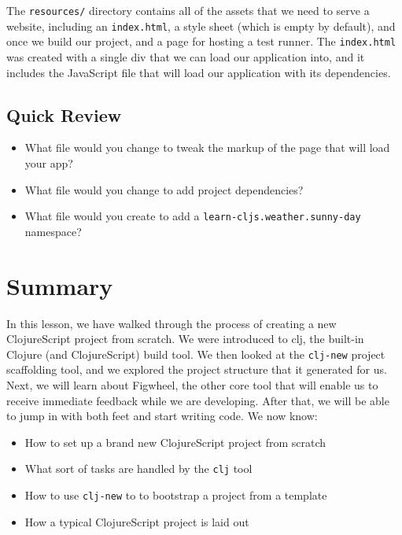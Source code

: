 \documentclass[10pt,twoside,openright]{memoir}
\begin{document}
The \texttt{resources/} directory contains all of the assets that we
need to serve a website, including an \texttt{index.html}, a style sheet
(which is empty by default), and once we build our project, and a page
for hosting a test runner. The \texttt{index.html} was created with a
single div that we can load our application into, and it includes the
JavaScript file that will load our application with its dependencies.

\subsection{Quick Review}

\begin{itemize}
\tightlist
\item
  What file would you change to tweak the markup of the page that will
  load your app?
\item
  What file would you change to add project dependencies?
\item
  What file would you create to add a
  \texttt{learn-cljs.weather.sunny-day} namespace?
\end{itemize}

\section{Summary}

In this lesson, we have walked through the process of creating a new
ClojureScript project from scratch. We were introduced to clj, the
built-in Clojure (and ClojureScript) build tool. We then looked at the
\texttt{clj-new} project scaffolding tool, and we explored the project
structure that it generated for us. Next, we will learn about Figwheel,
the other core tool that will enable us to receive immediate feedback
while we are developing. After that, we will be able to jump in with
both feet and start writing code. We now know:

\begin{itemize}
\tightlist
\item
  How to set up a brand new ClojureScript project from scratch
\item
  What sort of tasks are handled by the \texttt{clj} tool
\item
  How to use \texttt{clj-new} to to bootstrap a project from a template
\item
  How a typical ClojureScript project is laid out
\end{itemize}
\end{document}

